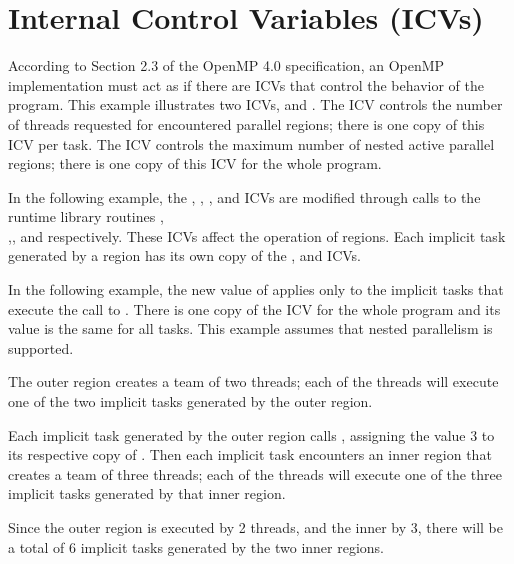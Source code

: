 \pagebreak
\chapter{Internal Control Variables (ICVs)}
\label{chap:icv}

According to Section 2.3 of the OpenMP 4.0 specification, an OpenMP implementation must act as if there are ICVs that control 
the behavior of the program.  This example illustrates two ICVs,  
and . The  ICV controls the 
number of threads requested for encountered parallel regions; there is one copy 
of this ICV per task. The  ICV controls the maximum 
number of nested active parallel regions; there is one copy of this ICV for the 
whole program.

In the following example, the , , 
, and  ICVs are modified through calls to 
the runtime library routines ,\\ ,, and  respectively. These ICVs 
affect the operation of  regions. Each implicit task generated 
by a  region has its own copy of the , 
and  ICVs.

In the following example, the new value of  applies only to 
the implicit tasks that execute the call to . There 
is one copy of the  ICV for the whole program and 
its value is the same for all tasks. This example assumes that nested parallelism 
is supported.

The outer  region creates a team of two threads; each of the threads 
will execute one of the two implicit tasks generated by the outer  
region.

Each implicit task generated by the outer  region calls , 
assigning the value 3 to its respective copy of . Then each 
implicit task encounters an inner  region that creates a team 
of three threads; each of the threads will execute one of the three implicit tasks 
generated by that inner  region.

Since the outer  region is executed by 2 threads, and the inner 
by 3, there will be a total of 6 implicit tasks generated by the two inner  
regions.

